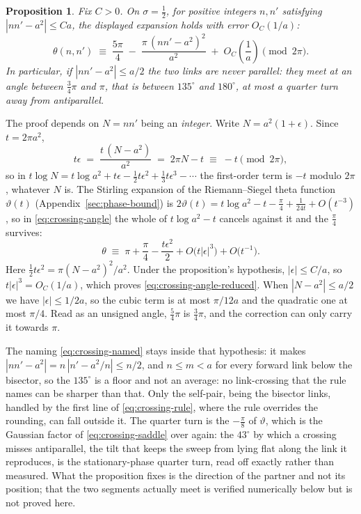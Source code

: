 \documentclass[11pt]{article}
\newtheorem{proposition}[theorem]{Proposition}
\theoremstyle{definition}
\begin{document}
\begin{proposition}\label{prop:crossing-angle}
Fix $C>0$. On $\sigma=\tfrac12$, for positive integers $n,n'$ satisfying
$|nn'-a^2|\leq Ca$, the displayed expansion holds with error $O_C(1/a)$:
\begin{equation}\label{eq:crossing-angle-reduced}
\theta(n,n')
\;\equiv\;
\frac{5\pi}{4}\;-\;\frac{\pi\,(nn'-a^{2})^{2}}{a^{2}}
\;+\;O_C\!\left(\frac1a\right)
\pmod{2\pi}.
\end{equation}
In particular, if $|nn'-a^{2}|\leq a/2$ the two links are never parallel: they
meet at an angle between $\tfrac34\pi$ and $\pi$, that is between $135^{\circ}$
and $180^{\circ}$, at most a quarter turn away from antiparallel.
\end{proposition}

The proof depends on $N=nn'$ being an \emph{integer}. Write $N=a^{2}(1+\epsilon)$.
Since $t=2\pi a^{2}$,
\begin{equation}\label{eq:crossing-angle-integrality}
t\epsilon\;=\;\frac{t\,(N-a^{2})}{a^{2}}\;=\;2\pi N-t\;\equiv\;-t\pmod{2\pi},
\end{equation}
so in
$t\log N=t\log a^{2}+t\epsilon-\tfrac12t\epsilon^{2}+\tfrac13t\epsilon^{3}-\cdots$
the first-order term is $-t$ modulo $2\pi$, whatever $N$ is. The Stirling
expansion of the Riemann--Siegel theta function $\vartheta(t)$
(Appendix~\ref{sec:phase-bound}) is
$2\vartheta(t)=t\log a^{2}-t-\tfrac{\pi}{4}+\tfrac{1}{24t}+O(t^{-3})$, so in
\eqref{eq:crossing-angle} the whole of $t\log a^{2}-t$ cancels against it and
the $\tfrac\pi4$ survives:
\[
\theta\;\equiv\;\pi+\frac{\pi}{4}-\frac{t\epsilon^{2}}{2}
+O\bigl(t|\epsilon|^{3}\bigr)+O\bigl(t^{-1}\bigr).
\]
Here $\tfrac12t\epsilon^{2}=\pi(N-a^{2})^{2}/a^{2}$. Under the proposition's
hypothesis, $|\epsilon|\leq C/a$, so
$t|\epsilon|^3=O_C(1/a)$, which proves
\eqref{eq:crossing-angle-reduced}. When $|N-a^{2}|\leq a/2$ we have
$|\epsilon|\leq1/2a$, so the cubic term is
at most $\pi/12a$ and the quadratic one at most $\pi/4$. Read as an unsigned
angle, $\tfrac54\pi$ is $\tfrac34\pi$, and the correction can only carry it
towards $\pi$.

The naming \eqref{eq:crossing-named} stays inside that hypothesis: it makes
$|nn'-a^{2}|=n\,|n'-a^{2}/n|\leq n/2$, and $n\leq m<a$ for every forward link
below the bisector, so the $135^{\circ}$ is a floor and not an average: no
link-crossing that the rule names can be sharper than that. Only the
self-pair, being the bisector links, handled by the first line of
\eqref{eq:crossing-rule}, where the rule overrides the rounding, can fall
outside it. The quarter turn is the
$-\tfrac\pi8$ of $\vartheta$, which is the Gaussian factor of
\eqref{eq:crossing-saddle} over again: the $43^{\circ}$ by which a crossing
misses antiparallel, the tilt that keeps the sweep from lying flat along the
link it reproduces, is the stationary-phase quarter turn, read off exactly
rather than measured. What the proposition fixes is the direction of the
partner and not its position; that the two segments actually meet is
verified numerically below but is not proved here.
\end{document}
